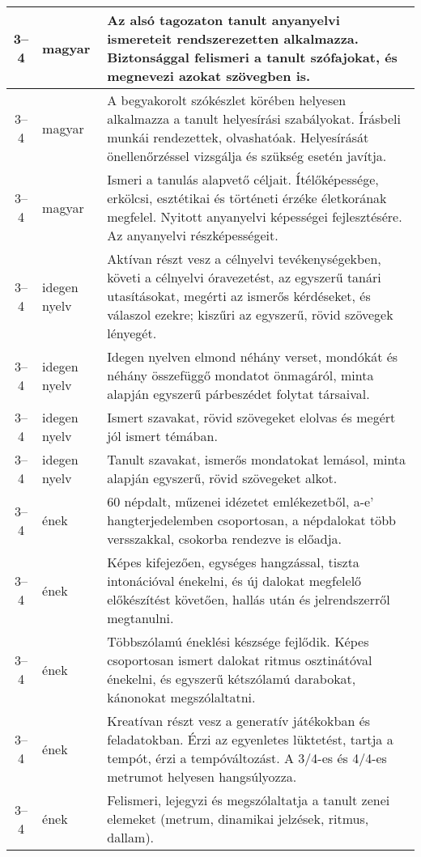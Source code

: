 \begin{small}
\begin{longtable}{c | p{2cm} |  p{11cm} }
              3--4 & magyar & Az alsó tagozaton tanult anyanyelvi ismereteit rendszerezetten alkalmazza. Biztonsággal felismeri a tanult szófajokat, és megnevezi azokat szövegben is. \\ \hline
              3--4 & magyar & A begyakorolt szókészlet körében helyesen alkalmazza a tanult helyesírási szabályokat. Írásbeli munkái rendezettek, olvashatóak. Helyesírását önellenőrzéssel vizsgálja és szükség esetén javítja. \\ \hline
              3--4 & magyar & Ismeri a tanulás alapvető céljait. Ítélőképessége, erkölcsi, esztétikai és történeti érzéke életkorának megfelel. Nyitott anyanyelvi képességei fejlesztésére. Az anyanyelvi részképességeit. \\ \hline
              3--4 & idegen nyelv & Aktívan részt vesz a célnyelvi tevékenységekben, követi a célnyelvi óravezetést, az egyszerű tanári utasításokat, megérti az ismerős kérdéseket, és válaszol ezekre; kiszűri az egyszerű, rövid szövegek lényegét. \\ \hline
              3--4 & idegen nyelv & Idegen nyelven elmond néhány verset, mondókát és néhány összefüggő mondatot önmagáról, minta alapján egyszerű párbeszédet folytat társaival. \\ \hline
              3--4 & idegen nyelv & Ismert szavakat, rövid szövegeket elolvas és megért jól ismert témában. \\ \hline
              3--4 & idegen nyelv & Tanult szavakat, ismerős mondatokat lemásol, minta alapján egyszerű, rövid szövegeket alkot. \\ \hline
              3--4 & ének & 60 népdalt, műzenei idézetet emlékezetből, a-e’ hangterjedelemben csoportosan, a népdalokat több versszakkal, csokorba rendezve is előadja. \\ \hline
              3--4 & ének & Képes kifejezően, egységes hangzással, tiszta intonációval énekelni, és új dalokat megfelelő előkészítést követően, hallás után és jelrendszerről megtanulni. \\ \hline
              3--4 & ének & Többszólamú éneklési készsége fejlődik. Képes csoportosan ismert dalokat ritmus osztinátóval énekelni, és egyszerű kétszólamú darabokat, kánonokat megszólaltatni. \\ \hline
              3--4 & ének & Kreatívan részt vesz a generatív játékokban és feladatokban. Érzi az egyenletes lüktetést, tartja a tempót, érzi a tempóváltozást. A 3/4-es és 4/4-es metrumot helyesen hangsúlyozza. \\ \hline
              3--4 & ének & Felismeri, lejegyzi és megszólaltatja a tanult zenei elemeket (metrum, dinamikai jelzések, ritmus, dallam). \\ \hline

\end{longtable}
\end{small}
